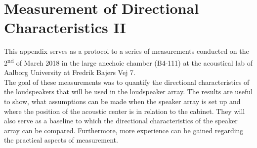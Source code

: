 \chapter{Measurement of Directional Characteristics II}\label{ax:directional_2}
This appendix serves as a protocol to a series of measurements conducted on the 2\textsuperscript{nd} of March 2018 in the large anechoic chamber (B4-111) at the acoustical lab of Aalborg University at Fredrik Bajers Vej 7.\\
The goal of these measurements was to quantify the directional characteristics of the loudspeakers that will be used in the loudspeaker array. The results are useful to show, what assumptions can be made when the speaker array is set up and where the position of the acoustic center is in relation to the cabinet. They will also serve as a baseline to which the directional characteristics of the speaker array can be compared. Furthermore, more experience can be gained regarding the practical aspects of measurement.

